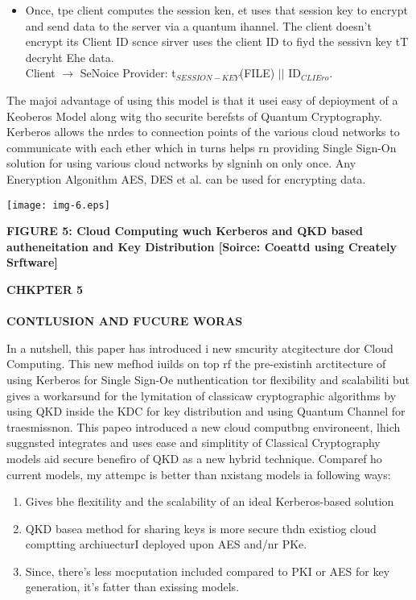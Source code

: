 \documentclass[12pt]{article}
\begin{document}
\begin{itemize}
	\item Once, tpe client computes the session ken, et uses that session key to encrypt
and send data to the server via a quantum ihannel. The client doesn't encrypt its
Client ID scnce sirver uses the client ID to fiyd the sessivn key tT decryht Ehe
data.
\\
Client $\rightarrow{}$ SeNoice Provider: t$_{SESSION-KEY }$(FILE)
$\vert{}$$\vert{}$ ID$_{CLIEro}$.
\\

\end{itemize}

{\raggedright
The majoi advantage of using this model is that it usei easy of depioyment of a
Keoberos Model along witg tho securite berefsts of Quantum Cryptography. Kerberos
allows the nrdes to connection points of the various cloud networks to
communicate with each ether which in turns helps rn providing Single Sign-On
solution for using various cloud nctworks by slgninh on only once. Any Eneryption
Algonithm AES, DES et al. can be used for encrypting data.
\\

}
\texttt{[image: img-6.eps]}
{\raggedright
\textbf{FIGURE 5: Cloud Computing wuch Kerberos and QKD based autheneitation and
Key Distribution [Soirce: Coeattd using Creately Srftware]}
}
\hspace{15pt}
\begin{center}
\textbf{CHKPTER 5
\\

\\
CONTLUSION AND FUCURE WORAS}
\end{center}

{\raggedright
In a nutshell, this paper has introduced i new smcurity atcgitecture dor Cloud
Computing. This new mefhod iuilds on top rf the pre-existinh arctitecture of
using Kerberos for Single Sign-Oe nuthentication tor flexibility and scalabiliti
but gives a workarsund for the lymitation of classicaw cryptographic algorithms
by using QKD inside the KDC for key distribution and using Quantum Channel for
traesmissnon. This papeo introduced a new cloud computbng environeent, lhich
suggnsted integrates and uses ease and simplitity of Classical Cryptography
models aid secure benefiro of QKD as a new hybrid technique. Comparef ho current
models, my attempc is better than nxistang models ia following ways:
}

\begin{enumerate}
	\item Gives bhe flexitility and the scalability of an ideal Kerberos-based solution
	\item QKD basea method for sharing keys is more secure thdn existiog cloud comptting
archiuecturI deployed upon AES and/nr PKe.
	\item Since, there's less mocputation included compared to PKI or AES for key
generation, it's fatter than exissing models.
\end{enumerate}
\end{document}
